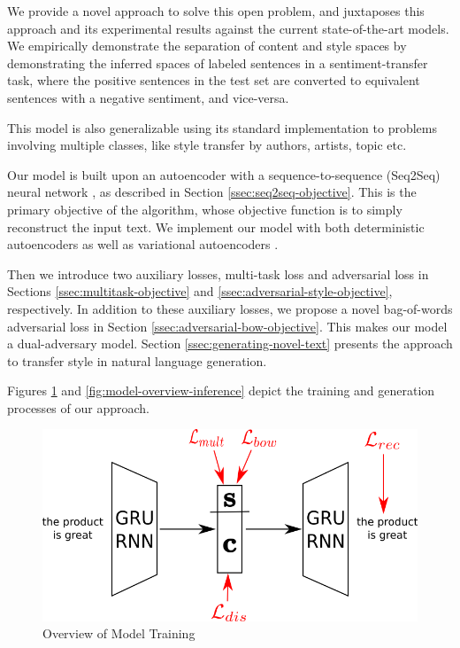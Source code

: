 We provide a novel approach to solve this open problem, and juxtaposes this approach and its experimental results against the current state-of-the-art models. We empirically demonstrate the separation of content and style spaces by demonstrating the inferred spaces of labeled sentences in a sentiment-transfer task, where the positive sentences in the test set are converted to equivalent sentences with a negative sentiment, and vice-versa.

This model is also generalizable using its standard implementation to problems involving multiple classes, like style transfer by authors, artists, topic etc.

Our model is built upon an autoencoder with a sequence-to-sequence (Seq2Seq) neural network \citep{sutskever2014sequence}, as described in Section \ref{ssec:seq2seq-objective}. This is the primary objective of the algorithm, whose objective function is to simply reconstruct the input text. We implement our model with both deterministic autoencoders \citep{baldi2012autoencoders} as well as variational autoencoders \citep{kingma2013auto}.

Then we introduce two auxiliary losses, multi-task loss and adversarial loss in Sections \ref{ssec:multitask-objective} and \ref{ssec:adversarial-style-objective}, respectively. In addition to these auxiliary losses, we propose a novel bag-of-words adversarial loss in Section \ref{ssec:adversarial-bow-objective}. This makes our model a dual-adversary model. Section \ref{ssec:generating-novel-text} presents the approach to transfer style in natural language generation.

Figures \ref{fig:model-overview-training} and \ref{fig:model-overview-inference} depict the training and generation processes of our approach.

\begin{figure}[ht]
	\centering
	\includegraphics[width=\linewidth]{images/model-overview-training}
	\caption{Overview of Model Training}
	\label{fig:model-overview-training}
\end{figure}

